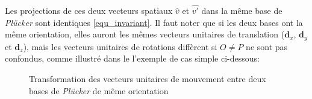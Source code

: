 \documentclass{report}
\begin{document}
Les projections de ces deux vecteurs spatiaux $\widehat{v}$ et $\widehat{v'}$ dans la même base de \emph{Plücker} sont identiques \eqref{equ_invariant}. Il faut noter que si les deux bases ont la même orientation, elles auront les mêmes vecteurs unitaires de translation ($\textbf{d}_{x}$, $\textbf{d}_{y}$ et $\textbf{d}_{z}$), mais les vecteurs unitaires de rotations diffèrent si $O \neq P$ ne sont pas confondus, comme illustré dans le l'exemple de cas simple ci-dessous:

\begin{figure}[H]
\begin{center}
  \hspace{.05\textwidth}
  \hspace{.05\textwidth}
  \caption{Transformation des vecteurs unitaires de mouvement entre deux bases de \emph{Plücker} de même orientation}  %
  \label{fig_transPlucker}    %
\end{center}
\end{figure}
\end{document}
